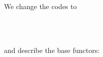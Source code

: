 We change the codes to
\begin{code}%
%
\>[2]\AgdaSpace{}%
\AgdaSpace{}%
\<%
\\
\>[2][@{}l@{\AgdaIndent{0}}]%
\>[4]\AgdaSpace{}%
%
\>[13]\AgdaSymbol{:}\AgdaSpace{}%
\<%
\\
%
\>[4]\AgdaSpace{}%
%
\>[13]\AgdaSymbol{:}\AgdaSpace{}%
\AgdaSpace{}%
\AgdaSpace{}%
\AgdaSpace{}%
\AgdaSpace{}%
\<%
\end{code}
and describe the base functors:
\begin{code}%
%
\>[2]\AgdaSpace{}%
%
\>[11]\AgdaSpace{}%
\AgdaSpace{}%
\AgdaSymbol{=}\AgdaSpace{}%
\<%
\\
%
\>[2]\AgdaSpace{}%
%
\>[11]\AgdaSpace{}%
\AgdaSpace{}%
\AgdaSymbol{=}\AgdaSpace{}%
\<%
\\
%
\>[2]\AgdaSpace{}%
\AgdaSpace{}%
\AgdaSpace{}%
%
\>[11]\AgdaSpace{}%
\AgdaSpace{}%
\AgdaSymbol{=}\AgdaSpace{}%
\AgdaSymbol{(}\AgdaSpace{}%
\AgdaSpace{}%
\AgdaSpace{}%
\AgdaSymbol{)}\AgdaSpace{}%
\AgdaSpace{}%
\AgdaSymbol{(}\AgdaSpace{}%
\AgdaSpace{}%
\AgdaSpace{}%
\AgdaSymbol{)}\<%
\\
%
\>[2]\AgdaSpace{}%
\AgdaSpace{}%
\AgdaSpace{}%
%
\>[11]\AgdaSpace{}%
\AgdaSpace{}%
\AgdaSymbol{=}\AgdaSpace{}%
\AgdaSymbol{(}\AgdaSpace{}%
\AgdaSpace{}%
\AgdaSpace{}%
\AgdaSymbol{)}\AgdaSpace{}%
\AgdaSpace{}%
\AgdaSymbol{(}\AgdaSpace{}%
\AgdaSpace{}%
\AgdaSpace{}%
\AgdaSymbol{)}\<%
\end{code}
